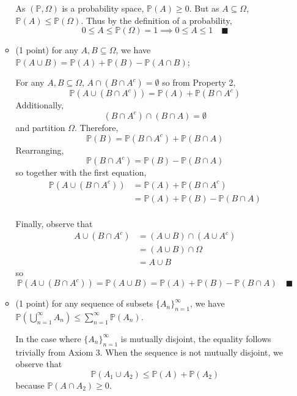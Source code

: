 \documentclass[11pt,letterpaper, leqno]{article}
\numberwithin{equation}{section}
\numberwithin{theorem}{section}
\numberwithin{lemma}{section}
\numberwithin{corollary}{section}
\numberwithin{definition}{section}
\numberwithin{proposition}{section}
\numberwithin{remark}{section}
\numberwithin{example}{section}
\renewcommand{\P}{\mathbb{P}}
\renewcommand{\qed}{\quad \blacksquare}
\begin{document}
\begin{enumerate}
\begin{itemize}
            \color{blue}
                As $(\P, \Omega)$ is a probability space, $\P(A) \geq 0$. But as $A \subseteq \Omega$, $\P(A) \leq \P(\Omega)$. Thus by the definition of a probability, 
                \[0 \leq A \leq \P(\Omega) = 1 \implies 0 \leq A \leq 1 \quad \blacksquare\]
            \color{black}

        \item (1 point) for any $A,B\subseteq\Omega$, we have $\mathbb{P}(A\cup B)=\mathbb{P}(A)+\mathbb{P}(B)-\mathbb{P}(A\cap B)$;
        
        \color{blue}
            For any $A, B \subseteq \Omega$, $A \cap (B \cap A^c) = \emptyset$ so from Property 2, 
            \[\mathbb{P}(A \cup (B \cap A^c))=\mathbb{P}(A)+\mathbb{P}(B \cap A^c)\]
            Additionally, 
            \[(B \cap A^c) \cap (B \cap A) = \emptyset\]
            and partition $\Omega$. Therefore, 
            \[\P(B) = \P(B \cap A^c) + \P(B \cap A)\]
            Rearranging, 
            \[\P(B \cap A^c) = \P(B) - \P(B \cap A)\]
            so together with the first equation,
            \begin{align*}
                \mathbb{P}(A \cup (B \cap A^c)) &= \mathbb{P}(A) + \P(B \cap A^c)\\
                &= \P(A) + \P(B) - \P(B \cap A)\\
            \end{align*}
            
            Finally, observe that 
            \begin{align*}
                A \cup (B\cap A^c) &= (A \cup B) \cap (A \cup A^c)\\
                &= (A \cup B) \cap \Omega\\
                &= A \cup B
            \end{align*} 
            so 
            \[\mathbb{P}(A \cup (B \cap A^c)) = \P(A \cup B) = \P(A) + \P(B) - \P(B \cap A) \qed\]
        \color{black}

        \item (1 point) for any sequence of subsets $\{A_n\}_{n=1}^\infty$, we have $\mathbb{P}(\bigcup_{n=1}^\infty A_n)\le\sum_{n=1}^\infty\mathbb{P}(A_n)$.
        
        \color{blue}
            In the case where $\{A_n\}_{n=1}^\infty$ is mutually disjoint, the equality follows trivially from Axiom 3. When the sequence is not mutually disjoint, we observe that 
            \[\P(A_1 \cup A_2) \leq \P(A) + \P(A_2)\] 
            because $\P(A \cap A_2)\geq 0$. 


\end{itemize}
\end{enumerate}
\end{document}
